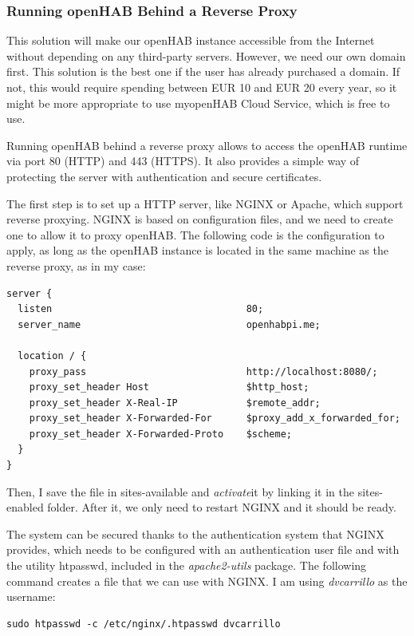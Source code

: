 \subsubsection{Running openHAB Behind a Reverse Proxy}
This solution will make our openHAB instance accessible from the Internet without depending on any third-party servers. However,
we need our own domain first. This solution is the best one if the user has already purchased a domain. If not, this would require
spending between EUR 10 and EUR 20 every year\cite{startBloggingDomainCost}, so it might be more appropriate to use myopenHAB
Cloud Service, which is free to use.

Running openHAB behind a reverse proxy allows to access the openHAB runtime via port 80 (HTTP) and 443 (HTTPS). It also provides a
simple way of protecting the server with authentication and secure certificates.

The first step is to set up a HTTP server, like NGINX or Apache, which support reverse proxying. NGINX is based on configuration
files, and we need to create one to allow it to proxy openHAB. The following code is the configuration to apply, as long as the
openHAB instance is located in the same machine as the reverse proxy, as in my case:

\begin{lstlisting}[style=Consola]
server {
  listen                                  80;
  server_name                             openhabpi.me;

  location / {
    proxy_pass                            http://localhost:8080/;
    proxy_set_header Host                 $http_host;
    proxy_set_header X-Real-IP            $remote_addr;
    proxy_set_header X-Forwarded-For      $proxy_add_x_forwarded_for;
    proxy_set_header X-Forwarded-Proto    $scheme;
  }
}
\end{lstlisting}

Then, I save the file in sites-available and \textit{activate}it by linking it in the sites-enabled folder. After it, we only need
to restart NGINX and it should be ready.

The system can be secured thanks to the authentication system that NGINX provides, which needs to be configured with an
authentication user file and with the utility htpasswd, included in the \textit{apache2-utils} package. The following command
creates a file that we can use with NGINX. I am using \textit{dvcarrillo} as the username:

\begin{lstlisting}[style=Consola]
sudo htpasswd -c /etc/nginx/.htpasswd dvcarrillo
\end{lstlisting}

